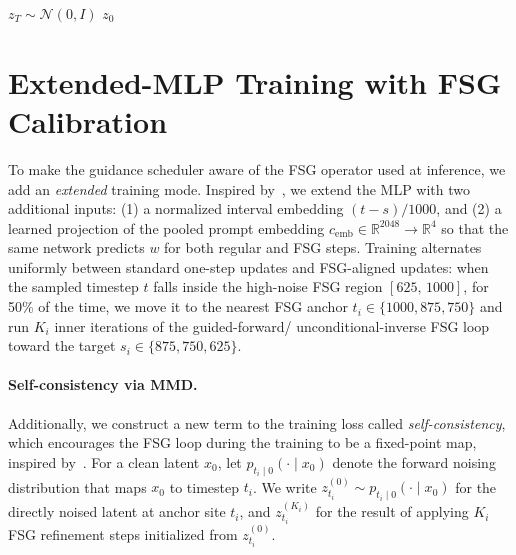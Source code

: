 \documentclass[acmtog]{acmart}
\begin{document}
\begin{algorithm}[t]
\caption{Annealing Inference with FSG (3 high-noise anchor sites, $K=(3,2,2)$)}
\label{alg:fsg_inference}
$z_T \sim \mathcal{N}(0, I)$\;
\KwRet $z_0$
\end{algorithm}

\section{Extended-MLP Training with FSG Calibration}
\label{sec:extended_mlp_training}
To make the guidance scheduler aware of the FSG operator used at inference, we add an \emph{extended} training mode.
Inspired by~\citet{learn2guide2025}, we extend the MLP with two additional inputs: (1) a normalized interval embedding $(t{-}s)/1000$, and (2) a learned projection of the pooled prompt embedding $c_{\text{emb}}\!\in\!\mathbb{R}^{2048}\!\to\!\mathbb{R}^{4}$ so that the same network predicts $w$ for both regular and FSG steps.
Training alternates uniformly between standard one-step updates and FSG-aligned updates: when the sampled timestep $t$ falls inside the high-noise FSG region $[625,\,1000]$, for 50\% of the time, we move it to the nearest FSG anchor $t_i\in\{1000,875,750\}$ and run $K_i$ inner iterations of the guided-forward/ unconditional-inverse FSG loop toward the target $s_i\in\{875,750,625\}$.

\paragraph{Self-consistency via MMD.}
Additionally, we construct a new term to the training loss called \emph{self-consistency}, which encourages the FSG loop during the training to be a fixed-point map, inspired by~\citet{learn2guide2025}.
For a clean latent \(x_0\), let \(p_{t_i\mid 0}(\cdot\mid x_0)\) denote the forward noising distribution that maps \(x_0\) to timestep \(t_i\). We write \(z_{t_i}^{(0)}\sim p_{t_i\mid 0}(\cdot\mid x_0)\) for the directly noised latent at anchor site \(t_i\), and \(z_{t_i}^{(K_i)}\) for the result of applying \(K_i\) FSG refinement steps initialized from \(z_{t_i}^{(0)}\).
\end{document}
